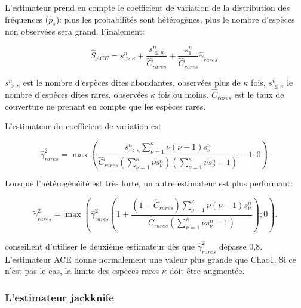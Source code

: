 \documentclass[
  11pt,
  french,
  a4paper,
  extrafontsizes,onecolumn,openright
  ]{memoir}
\begin{document}
L'estimateur prend en compte le coefficient de variation de la distribution des fréquences (\({\hat{p}}_s\)): plus les probabilités sont hétérogènes, plus le nombre d'espèces non observées sera grand.
Finalement:

\begin{equation}
  \label{eq:ACE}
  \hat{S}_{\mathit{ACE}} = s^{n}_{>\kappa} + \frac{s^{n}_{\le\kappa}}{\hat{C}_\mathit{rares}}+\frac{s^{n}_{1}}{{\hat{C}}_\mathit{rares}}{\hat{\gamma}}_\mathit{rares}.
\end{equation}

\(s^{n}_{>\kappa}\) est le nombre d'espèces dites abondantes, observées plus de \(\kappa\) fois, \(s^{n}_{\le\kappa}\) le nombre d'espèces dites rares, observées \(\kappa\) fois ou moins.
\(\hat{C}_\mathit{rares}\) est le taux de couverture ne prenant en compte que les espèces rares.

L'estimateur du coefficient de variation est

\begin{equation}
  \label{eq:ACEcv}
  \hat{\gamma}^{2}_\mathit{rares} = \max\left(\frac{s^{n}_{\le\kappa}\sum^{\kappa}_{\nu=1}{\nu\left(\nu-1\right){s^{n}_{\nu}}}}{\hat{C}_\mathit{rares}\left(\sum^{\kappa}_{\nu=1}{\nu s^{n}_{\nu}}\right)\left(\sum^{\kappa}_{\nu=1}{\nu s^{n}_{\nu}}-1\right)}-1; 0\right).
\end{equation}

Lorsque l'hétérogénéité est très forte, un autre estimateur est plus performant:

\begin{equation}
  \label{eq:ACEcv2}
  \tilde{\gamma}^{2}_\mathit{rares} = \max\left({\widehat{\gamma}}^2_\mathit{rares}\left(1+\frac{\left(1-{\hat{C}}_\mathit{rares}\right)\sum^{\kappa}_{\nu=1}{\nu\left(\nu -1\right){s^{n}_{\nu}}}}{{\hat{C}}_\mathit{rares}\left(\sum^{\kappa}_{\nu =1}{\nu s^{n}_{\nu}-1}\right)}\right); 0 \right).
\end{equation}

\textcite{Chao2010a} conseillent d'utiliser le deuxième estimateur dès que \({\widehat{\gamma}}^2_\mathit{rares}\) dépasse 0,8.
L'estimateur ACE donne normalement une valeur plus grande que Chao1.
Si ce n'est pas le cas, la limite des espèces rares \(\kappa\) doit être augmentée.

\hypertarget{lestimateur-jackknife}{%
\subsubsection{L'estimateur jackknife}\label{lestimateur-jackknife}}
\end{document}
